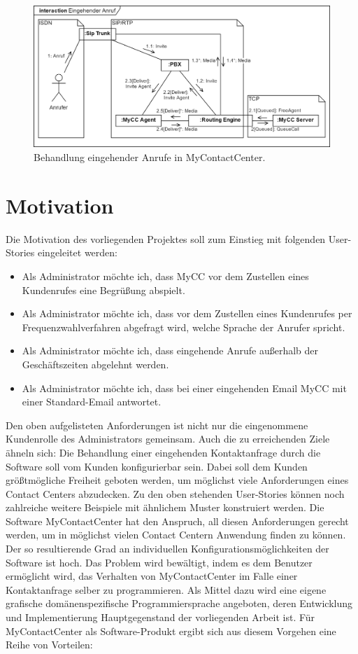 \begin{figure} %
	\centering
		\includegraphics[width=\textwidth]{img/RoutingEngineSipExplanation.png}
	\caption[Behandlung eingehender Rufe in MyContactCenter]{Behandlung eingehender Anrufe in MyContactCenter.}
	\label{fig:InteractionIncomingCall}
\end{figure}
 
\newpage
 
\section{Motivation}
\label{sec:Motivation}
Die Motivation des vorliegenden Projektes soll zum Einstieg mit folgenden User-Stories eingeleitet werden:
\begin{itemize}
\item Als Administrator möchte ich, dass MyCC vor dem Zustellen eines Kundenrufes eine Begrüßung abspielt.
\item Als Administrator möchte ich, dass  vor dem Zustellen eines Kundenrufes per Frequenzwahlverfahren abgefragt wird, welche Sprache der Anrufer spricht.
\item Als Administrator möchte ich, dass eingehende Anrufe außerhalb der Ge\-schäftszeiten abgelehnt werden.
\item Als Administrator möchte ich, dass bei einer eingehenden Email MyCC mit einer Standard-Email antwortet.
\end{itemize}
Den oben aufgelisteten Anforderungen ist nicht nur die eingenommene Kundenrolle des Administrators gemeinsam. Auch die zu erreichenden Ziele ähneln sich: Die Behandlung einer eingehenden Kontaktanfrage durch die Software soll vom Kunden konfigurierbar sein. Dabei soll dem Kunden größtmögliche Freiheit geboten werden, um möglichst viele Anforderungen eines Contact Centers abzudecken. Zu den oben stehenden User-Stories können noch zahlreiche weitere Beispiele mit ähnlichem Muster konstruiert werden. Die Software MyContactCenter hat den Anspruch, all diesen Anforderungen gerecht werden, um in möglichst vielen Contact Centern Anwendung finden zu können. Der so resultierende Grad an individuellen Konfigurationsmöglichkeiten der Software ist hoch. Das Problem wird bewältigt, indem es dem Benutzer ermöglicht wird, das Verhalten von MyContactCenter im Falle einer Kontaktanfrage selber zu programmieren. Als Mittel dazu wird eine eigene grafische domänenspezifische Programmiersprache angeboten, deren Entwicklung und Implementierung Hauptgegenstand der vorliegenden Arbeit ist.
\newline
Für MyContactCenter als Software-Produkt ergibt sich aus diesem Vorgehen eine Reihe von Vorteilen:

